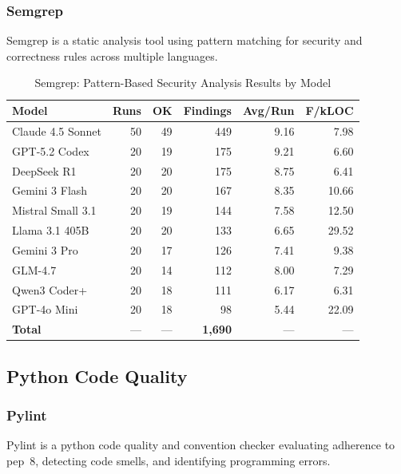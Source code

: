 \subsubsection{Semgrep}

Semgrep is a static analysis tool using pattern matching for security and correctness rules across multiple languages.

\begin{table}[htbp]
    \centering
    \caption{Semgrep: Pattern-Based Security Analysis Results by Model}
    \label{tab:tool_semgrep}
    \small
    \begin{tabular}{@{} l r r r r r @{}}
        \toprule
        \textbf{Model} & \textbf{Runs} & \textbf{OK} & \textbf{Findings} & \textbf{Avg/Run} & \textbf{F/kLOC} \\
        \midrule
        Claude 4.5 Sonnet & 50 & 49 & 449 & 9.16 & 7.98 \\
        GPT-5.2 Codex & 20 & 19 & 175 & 9.21 & 6.60 \\
        DeepSeek R1 & 20 & 20 & 175 & 8.75 & 6.41 \\
        Gemini 3 Flash & 20 & 20 & 167 & 8.35 & 10.66 \\
        Mistral Small 3.1 & 20 & 19 & 144 & 7.58 & 12.50 \\
        Llama 3.1 405B & 20 & 20 & 133 & 6.65 & 29.52 \\
        Gemini 3 Pro & 20 & 17 & 126 & 7.41 & 9.38 \\
        GLM-4.7 & 20 & 14 & 112 & 8.00 & 7.29 \\
        Qwen3 Coder+ & 20 & 18 & 111 & 6.17 & 6.31 \\
        GPT-4o Mini & 20 & 18 & 98 & 5.44 & 22.09 \\
        \midrule
        \textbf{Total} & --- & --- & \textbf{1{,}690} & --- & --- \\
        \bottomrule
    \end{tabular}
\end{table}

\subsection{Python Code Quality}

\subsubsection{Pylint}

Pylint is a python code quality and convention checker evaluating adherence to pep~8, detecting code smells, and identifying programming errors.


